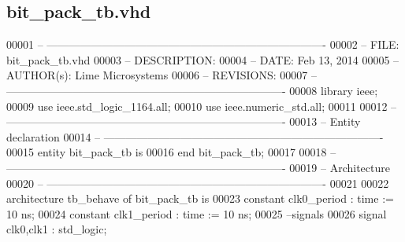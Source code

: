 \subsection{bit\+\_\+pack\+\_\+tb.\+vhd}
\label{bit__pack_2sim_2bit__pack__tb_8vhd_source}

\begin{DoxyCode}
00001 \textcolor{keyword}{-- ---------------------------------------------------------------------------- }
00002 \textcolor{keyword}{-- FILE:    bit\_pack\_tb.vhd}
00003 \textcolor{keyword}{-- DESCRIPTION: }
00004 \textcolor{keyword}{-- DATE:    Feb 13, 2014}
00005 \textcolor{keyword}{-- AUTHOR(s):   Lime Microsystems}
00006 \textcolor{keyword}{-- REVISIONS:}
00007 \textcolor{keyword}{-- ---------------------------------------------------------------------------- }
00008 \textcolor{vhdlkeyword}{library }\textcolor{keywordflow}{ieee};
00009 \textcolor{vhdlkeyword}{use }ieee.std\_logic\_1164.\textcolor{keywordflow}{all};
00010 \textcolor{vhdlkeyword}{use }ieee.numeric\_std.\textcolor{keywordflow}{all};
00011 
00012 \textcolor{keyword}{-- ----------------------------------------------------------------------------}
00013 \textcolor{keyword}{-- Entity declaration}
00014 \textcolor{keyword}{-- ----------------------------------------------------------------------------}
00015 \textcolor{keywordflow}{entity }bit_pack_tb \textcolor{keywordflow}{is}
00016 \textcolor{keywordflow}{end} \textcolor{vhdlchar}{bit\_pack\_tb};
00017 
00018 \textcolor{keyword}{-- ----------------------------------------------------------------------------}
00019 \textcolor{keyword}{-- Architecture}
00020 \textcolor{keyword}{-- ----------------------------------------------------------------------------}
00021 
00022 \textcolor{keywordflow}{architecture} tb\_behave \textcolor{keywordflow}{of} bit_pack_tb is
00023    \textcolor{keywordflow}{constant} \textcolor{vhdlchar}{clk0_period}   \textcolor{vhdlchar}{:} \textcolor{comment}{time} \textcolor{vhdlchar}{:=} \textcolor{vhdllogic}{}\textcolor{vhdllogic}{10} \textcolor{vhdlchar}{ns};
00024    \textcolor{keywordflow}{constant} \textcolor{vhdlchar}{clk1_period}   \textcolor{vhdlchar}{:} \textcolor{comment}{time} \textcolor{vhdlchar}{:=} \textcolor{vhdllogic}{}\textcolor{vhdllogic}{10} \textcolor{vhdlchar}{ns}; 
00025 \textcolor{keyword}{   --signals}
00026     \textcolor{keywordflow}{signal} \textcolor{vhdlchar}{clk0}\textcolor{vhdlchar}{,}\textcolor{vhdlchar}{clk1}        \textcolor{vhdlchar}{:} \textcolor{comment}{std\_logic};

\end{DoxyCode}
